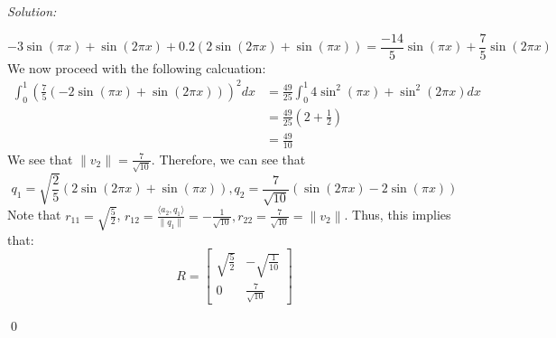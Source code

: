 \documentclass[12pt]{article}
\newenvironment{sol}
    {\emph{Solution:}
    }
    {
    \qed
    }
\begin{document}
\begin{sol}
    \[
    -3 \sin (\pi x) + \sin(2\pi x) + 0.2 (2 \sin(2\pi x) + \sin(\pi x)) = \frac{-14}{5} \sin(\pi x) + \frac{7}{5} \sin(2\pi x)
    \] 
    We now proceed with the following calcuation:
    \begin{align*}
        \int_{0}^{1} \left( \frac{7}{5} (-2\sin(\pi x) + \sin(2 \pi x)) \right)^2 dx &= \frac{49}{25} \int_{0}^{1} 4\sin^2 (\pi x) + \sin^2(2\pi x) dx \\
        &=  \frac{49}{25} \left( 2 + \frac{1}{2} \right)\\
        &= \frac{49}{10}
    \end{align*}
    We see that $\| v_2\| = \frac{7}{\sqrt{10}}$. Therefore, we can see that 
    \[
    q_1 = \sqrt{\frac{2}{5}} (2\sin (2\pi x) + \sin(\pi x)), q_2 = \frac{7}{\sqrt{10}} \left( \sin(2 \pi x) - 2\sin(\pi x) \right)
    \]
    Note that $r_{11} = \sqrt{\frac{5}{2}}$, $r_{12} = \frac{\langle a_2, q_1 \rangle}{\|q_1\|} = -\frac{1}{\sqrt{10}}, r_{22} = \frac{7}{\sqrt{10}} = \|v_2\|$. Thus, this implies that:
    \[
    R = \begin{bmatrix}
        \sqrt{\frac{5}{2}} & -\sqrt{\frac{1}{10}} \\
        0 & \frac{7}{\sqrt{10}}
    \end{bmatrix}
    \]
\end{sol}
\end{document}
